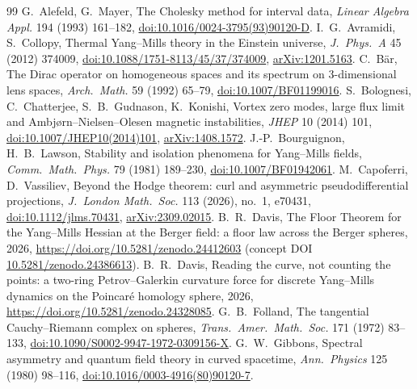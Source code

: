 \documentclass[11pt]{article}
\theoremstyle{definition}
\theoremstyle{remark}
\begin{document}
\begin{thebibliography}{99}\small
{} G.~Alefeld, G.~Mayer, The Cholesky method for interval data, \emph{Linear Algebra Appl.} 194 (1993) 161--182, \href{https://doi.org/10.1016/0024-3795(93)90120-D}{doi:10.1016/0024-3795(93)90120-D}.
 I.~G.~Avramidi, S.~Collopy, Thermal Yang--Mills theory in the Einstein universe, \emph{J.\ Phys.\ A} 45 (2012) 374009, \href{https://doi.org/10.1088/1751-8113/45/37/374009}{doi:10.1088/1751-8113/45/37/374009}, \href{https://arxiv.org/abs/1201.5163}{arXiv:1201.5163}.
 C.~B\"ar, The Dirac operator on homogeneous spaces and its spectrum on $3$-dimensional lens spaces, \emph{Arch.\ Math.} 59 (1992) 65--79, \href{https://doi.org/10.1007/BF01199016}{doi:10.1007/BF01199016}.
 S.~Bolognesi, C.~Chatterjee, S.~B.~Gudnason, K.~Konishi, Vortex zero modes, large flux limit and Ambj{\o}rn--Nielsen--Olesen magnetic instabilities, \emph{JHEP} 10 (2014) 101, \href{https://doi.org/10.1007/JHEP10(2014)101}{doi:10.1007/JHEP10(2014)101}, \href{https://arxiv.org/abs/1408.1572}{arXiv:1408.1572}.
 J.-P.~Bourguignon, H.~B.~Lawson, Stability and isolation phenomena for Yang--Mills fields, \emph{Comm.\ Math.\ Phys.} 79 (1981) 189--230, \href{https://doi.org/10.1007/BF01942061}{doi:10.1007/BF01942061}.
 M.~Capoferri, D.~Vassiliev, Beyond the Hodge theorem: curl and asymmetric pseudodifferential projections, \emph{J.\ London Math.\ Soc.} 113 (2026), no.~1, e70431, \href{https://doi.org/10.1112/jlms.70431}{doi:10.1112/jlms.70431}, \href{https://arxiv.org/abs/2309.02015}{arXiv:2309.02015}.
 B.~R.~Davis, The Floor Theorem for the Yang--Mills Hessian at the Berger field: a floor law across the Berger spheres, 2026, \url{https://doi.org/10.5281/zenodo.24412603} (concept DOI \href{https://doi.org/10.5281/zenodo.24386613}{10.5281/zenodo.24386613}).
 B.~R.~Davis, Reading the curve, not counting the points: a two-ring Petrov--Galerkin curvature force for discrete Yang--Mills dynamics on the Poincar\'e homology sphere, 2026, \url{https://doi.org/10.5281/zenodo.24328085}.
 G.~B.~Folland, The tangential Cauchy--Riemann complex on spheres, \emph{Trans.\ Amer.\ Math.\ Soc.} 171 (1972) 83--133, \href{https://doi.org/10.1090/S0002-9947-1972-0309156-X}{doi:10.1090/S0002-9947-1972-0309156-X}.
 G.~W.~Gibbons, Spectral asymmetry and quantum field theory in curved spacetime, \emph{Ann.\ Physics} 125 (1980) 98--116, \href{https://doi.org/10.1016/0003-4916(80)90120-7}{doi:10.1016/0003-4916(80)90120-7}.

\end{thebibliography}
\end{document}
